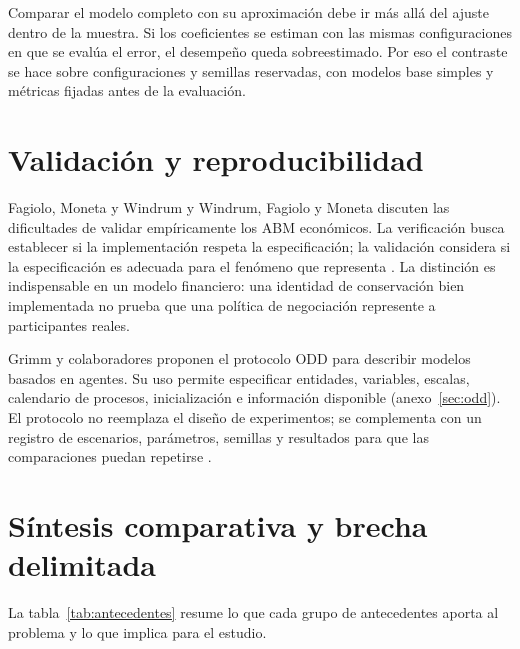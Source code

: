 Comparar el modelo completo con su aproximación debe ir más allá del ajuste dentro de la muestra. Si los coeficientes se estiman con las mismas configuraciones en que se evalúa el error, el desempeño queda sobreestimado. Por eso el contraste se hace sobre configuraciones y semillas reservadas, con modelos base simples y métricas fijadas antes de la evaluación.

\section{Validación y reproducibilidad}

Fagiolo, Moneta y Windrum \cite{fagiolo2007critical} y Windrum, Fagiolo y Moneta \cite{windrum2007empirical} discuten las dificultades de validar empíricamente los ABM económicos. La verificación busca establecer si la implementación respeta la especificación; la validación considera si la especificación es adecuada para el fenómeno que representa \cite{sargent2013verification}. La distinción es indispensable en un modelo financiero: una identidad de conservación bien implementada no prueba que una política de negociación represente a participantes reales.

Grimm y colaboradores \cite{grimm2020odd} proponen el protocolo ODD para describir modelos basados en agentes. Su uso permite especificar entidades, variables, escalas, calendario de procesos, inicialización e información disponible (anexo~\ref{sec:odd}). El protocolo no reemplaza el diseño de experimentos; se complementa con un registro de escenarios, parámetros, semillas y resultados para que las comparaciones puedan repetirse \cite{railsback2019agent,thiele2014facilitating}.

\section{Síntesis comparativa y brecha delimitada}

La tabla~\ref{tab:antecedentes} resume lo que cada grupo de antecedentes aporta al problema y lo que implica para el estudio.

